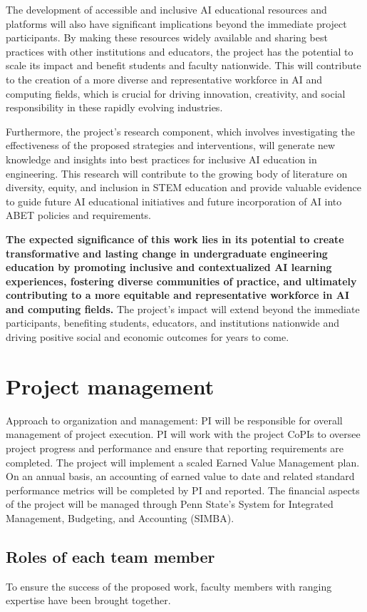 \documentclass[11pt]{article}
\begin{document}
The development of accessible and inclusive AI educational resources and platforms will also have significant implications beyond the immediate project participants. By making these resources widely available and sharing best practices with other institutions and educators, the project has the potential to scale its impact and benefit students and faculty nationwide. This will contribute to the creation of a more diverse and representative workforce in AI and computing fields, which is crucial for driving innovation, creativity, and social responsibility in these rapidly evolving industries.

Furthermore, the project's research component, which involves investigating the effectiveness of the proposed strategies and interventions, will generate new knowledge and insights into best practices for inclusive AI education in engineering. This research will contribute to the growing body of literature on diversity, equity, and inclusion in STEM education and provide valuable evidence to guide future AI educational initiatives and future incorporation of AI into ABET policies and requirements.

\textbf{The expected significance of this work lies in its potential to create transformative and lasting change in undergraduate engineering education by promoting inclusive and contextualized AI learning experiences, fostering diverse communities of practice, and ultimately contributing to a more equitable and representative workforce in AI and computing fields.} The project's impact will extend beyond the immediate participants, benefiting students, educators, and institutions nationwide and driving positive social and economic outcomes for years to come.

\section{Project management}
Approach to organization and management: PI will be responsible for overall management of project execution.  PI will work with the project CoPIs to oversee project progress and performance and ensure that reporting requirements are completed.  The project will implement a scaled Earned Value Management plan. On an annual basis, an accounting of earned value to date and related standard performance metrics will be completed by PI and reported. The financial aspects of the project will be managed through Penn State’s System for Integrated Management, Budgeting, and Accounting (SIMBA). 
\subsection{Roles of each team member}
To ensure the success of the proposed work, faculty members with ranging expertise have been brought together. 
\end{document}
